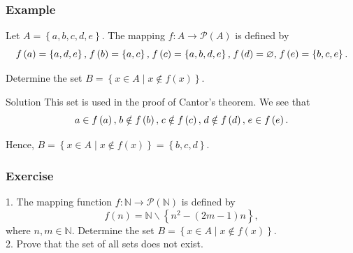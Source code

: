 \documentclass{beamer}
\begin{document}
\begin{frame}
    \frametitle{Example}
    \hh Let $A = \left\{ {a,b,c,d,e} \right\}$. The mapping $f:A \to \mathcal{P}\left( A \right)$ is defined by
    \begin{equation*}
        {f\left( a \right) = \left\{ {a,d,e} \right\},\;}\kern0pt{f\left( b \right) = \left\{ {a,c} \right\},\;}\kern0pt{f\left( c \right) = \left\{ {a,b,d,e} \right\},\;}\kern0pt{f\left( d \right) = \varnothing,\;}\kern0pt{f\left( e \right) = \left\{ {b,c,e} \right\}.}
    \end{equation*}
    \par Determine the set $B = \left\{ {x \in A \mid x \not\in f\left( x \right)} \right\}.$
    \vv
    \begin{block}{Solution}
        This set is used in the proof of Cantor’s theorem. We see that
        \begin{equation*}
            {a \in f\left( a \right),\;}\kern0pt{b \notin f\left( b \right),\;}\kern0pt{c \notin f\left( c \right),\;}\kern0pt{d \notin f\left( d \right),\;}\kern0pt{e \in f\left( e \right).}
        \end{equation*}
    \par Hence, ${B = \left\{ {x \in A \mid x \notin f\left( x \right)} \right\} }={ \left\{ {b,c,d} \right\}.}$
    \end{block}
\end{frame}
\begin{frame}
    \frametitle{Exercise}
    1. The mapping function $f:\mathbb{N} \to \mathcal{P}\left( \mathbb{N} \right)$ is defined by 
    \begin{equation*}
        f\left( n \right) = \mathbb{N}\backslash \left\{ {{n^2} - \left( {2m - 1} \right)n} \right\},
    \end{equation*}
    where $n,m \in \mathbb{N}$. Determine the set $B = \left\{ {x \in A \mid x \not\in f\left( x \right)} \right\}.$
    \vs{4em}\\
    2. Prove that the set of all sets does not exist.
\end{frame}
\end{document}
